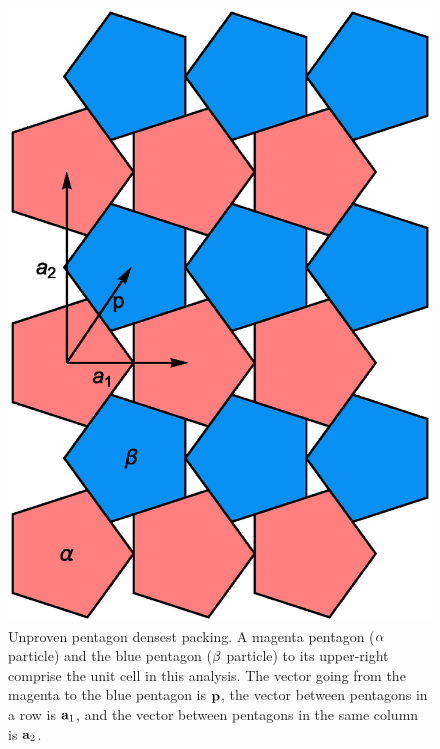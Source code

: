 \documentclass[12pt]{article}
\begin{document}
\begin{figure}
\centering
\includegraphics[scale=0.6]{pentagons.eps}
\caption{Unproven pentagon densest packing. A magenta pentagon ($\alpha$ particle) and the blue pentagon ($\beta$ particle) to its upper-right comprise the unit cell in this analysis. The vector going from the magenta to the blue pentagon is $\mathbf{p}$, the vector between pentagons in a row is $\mathbf{a}_1$, and the vector between pentagons in the same column is $\mathbf{a}_2$.}
\label{pentcrystal}
\end{figure}
\end{document}
